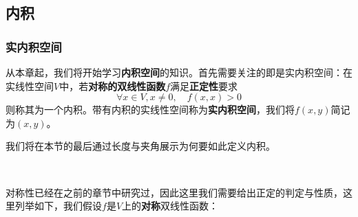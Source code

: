 \documentclass[a4paper,UTF8,fontset=windows,AutoFakeBold]{ctexart}
\newcommand*{\note}{\noindent *}
\begin{document}
\subsection{内积}
\subsubsection{实内积空间}
从本章起，我们将开始学习\textbf{内积空间}的知识。首先需要关注的即是实内积空间：在实线性空间$V$中，若\textbf{对称的双线性函数}$f$满足\textbf{正定性}要求
$$\forall x\in V,x\ne0,\quad f(x,x)>0$$
则称其为一个内积。带有内积的实线性空间称为\textbf{实内积空间}，我们将$f(x,y)$简记为$(x,y)$。

\note 我们将在本节的最后通过长度与夹角展示为何要如此定义内积。

\

对称性已经在之前的章节中研究过，因此这里我们需要给出正定的判定与性质，这里列举如下，我们假设$f$是$V$上的\textbf{对称}双线性函数：
\end{document}
